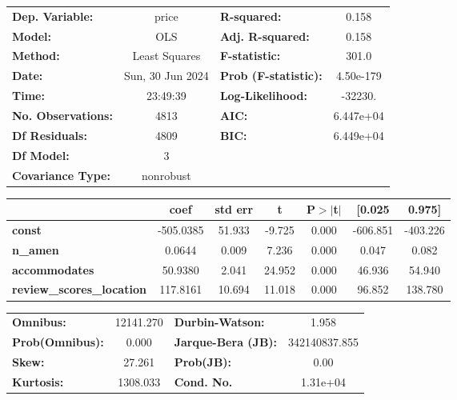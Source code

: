 \begin{center}
\begin{tabular}{lclc}
\toprule
\textbf{Dep. Variable:}           &      price       & \textbf{  R-squared:         } &       0.158    \\
\textbf{Model:}                   &       OLS        & \textbf{  Adj. R-squared:    } &       0.158    \\
\textbf{Method:}                  &  Least Squares   & \textbf{  F-statistic:       } &       301.0    \\
\textbf{Date:}                    & Sun, 30 Jun 2024 & \textbf{  Prob (F-statistic):} &   4.50e-179    \\
\textbf{Time:}                    &     23:49:39     & \textbf{  Log-Likelihood:    } &     -32230.    \\
\textbf{No. Observations:}        &        4813      & \textbf{  AIC:               } &   6.447e+04    \\
\textbf{Df Residuals:}            &        4809      & \textbf{  BIC:               } &   6.449e+04    \\
\textbf{Df Model:}                &           3      & \textbf{                     } &                \\
\textbf{Covariance Type:}         &    nonrobust     & \textbf{                     } &                \\
\bottomrule
\end{tabular}
\begin{tabular}{lcccccc}
                                  & \textbf{coef} & \textbf{std err} & \textbf{t} & \textbf{P$> |$t$|$} & \textbf{[0.025} & \textbf{0.975]}  \\
\midrule
\textbf{const}                    &    -505.0385  &       51.933     &    -9.725  &         0.000        &     -606.851    &     -403.226     \\
\textbf{n\_amen}                  &       0.0644  &        0.009     &     7.236  &         0.000        &        0.047    &        0.082     \\
\textbf{accommodates}             &      50.9380  &        2.041     &    24.952  &         0.000        &       46.936    &       54.940     \\
\textbf{review\_scores\_location} &     117.8161  &       10.694     &    11.018  &         0.000        &       96.852    &      138.780     \\
\bottomrule
\end{tabular}
\begin{tabular}{lclc}
\textbf{Omnibus:}       & 12141.270 & \textbf{  Durbin-Watson:     } &       1.958    \\
\textbf{Prob(Omnibus):} &    0.000  & \textbf{  Jarque-Bera (JB):  } & 342140837.855  \\
\textbf{Skew:}          &   27.261  & \textbf{  Prob(JB):          } &        0.00    \\
\textbf{Kurtosis:}      &  1308.033 & \textbf{  Cond. No.          } &    1.31e+04    \\
\bottomrule
\end{tabular}
\end{center}

